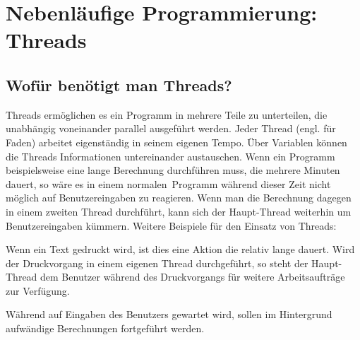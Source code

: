 \chapter{Nebenläufige Programmierung: Threads}
\renewcommand{\chaptertitle}{Nebenläufige Programmierung: Threads}

\lehead[]{\sf\hspace*{-2.00cm}\textcolor{white}{\colorbox{lightblue}{\makebox[1.60cm][r]{\thechapter}}}\hspace{0.17cm}\textcolor{lightblue}{\chaptertitle}}
\rohead[]{\textcolor{lightblue}{\chaptertitle}\sf\hspace*{0.17cm}\textcolor{white}{\colorbox{lightblue}{\makebox[1.60cm][l]{\thechapter}}}\hspace{-2.00cm}}
\rehead[]{\textcolor{lightblue}{AvHG, Inf, My}}
\lohead[]{\textcolor{lightblue}{AvHG, Inf, My}}

\lstset{style=myJava}

\section{Wofür benötigt man Threads?}

Threads ermöglichen es ein Programm in mehrere Teile zu unterteilen, die
unabhängig voneinander parallel ausgeführt werden. Jeder Thread (engl. für
Faden) arbeitet eigenständig in seinem eigenen Tempo. Über Variablen können die
Threads Informationen untereinander austauschen. Wenn ein Programm
beispielsweise eine lange Berechnung durchführen muss, die mehrere Minuten
dauert, so wäre es in einem \glqq normalen\grqq\ Programm während dieser Zeit
nicht möglich auf Benutzereingaben zu reagieren. Wenn man die Berechnung dagegen
in einem zweiten Thread durchführt, kann sich der Haupt-Thread weiterhin um
Benutzereingaben kümmern. Weitere Beispiele für den Einsatz von Threads:

\begin{compactitem}
\item Wenn ein Text gedruckt wird, ist dies eine Aktion die relativ lange
dauert. Wird der Druckvorgang in einem eigenen Thread durchgeführt, so steht der
Haupt-Thread dem Benutzer während des Druckvorgangs für weitere Arbeitsaufträge
zur Verfügung.

\item Während auf Eingaben des Benutzers gewartet wird, sollen im Hintergrund
aufwändige Berechnungen fortgeführt werden.
\end{compactitem}

